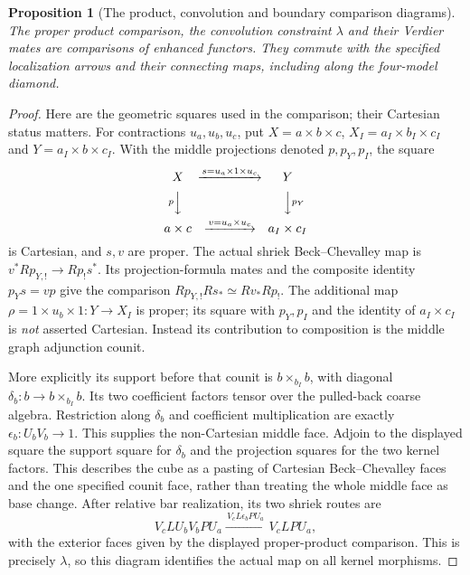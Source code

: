 \documentclass[11pt]{article}
\newtheorem{proposition}{Proposition}[section]
\theoremstyle{definition}
\theoremstyle{remark}
\begin{document}
\begin{proposition}[The product, convolution and boundary comparison diagrams]
\label{prop:mixed-comparison-diagrams}
The proper product comparison, the convolution constraint $\lambda$
and their Verdier mates are comparisons of enhanced functors.  They
commute with the specified localization arrows and their connecting
maps, including along the four-model diamond.
\end{proposition}
\begin{proof}
Here are the geometric squares used in the comparison; their
Cartesian status matters.  For contractions $u_a,u_b,u_c$, put
$X=a\times b\times c$, $X_I=a_I\times b_I\times c_I$ and
$Y=a_I\times b\times c_I$.  With the middle projections denoted
$p,p_Y,p_I$, the square
\[
\begin{CD}
 X @>{s=u_a\times1\times u_c}>> Y\\
 @V{p}VV @VV{p_Y}V\\
 a\times c @>{v=u_a\times u_c}>> a_I\times c_I
\end{CD}
\]
is Cartesian, and $s,v$ are proper.  The actual shriek
Beck--Chevalley map is $v^*Rp_{Y,!}\to Rp_!s^*$.
Its projection-formula mates and the composite identity
$p_Ys=vp$ give the comparison
$Rp_{Y,!}Rs_*\simeq Rv_*Rp_!$.
The additional map $\rho=1\times u_b\times1:Y\to X_I$ is
proper; its square with $p_Y,p_I$ and the identity of $a_I\times c_I$
is \emph{not} asserted Cartesian.  Instead its contribution to
composition is the middle graph adjunction counit.

More explicitly its support before that counit is
$b\times_{b_I}b$, with diagonal
$\delta_b:b\to b\times_{b_I}b$.  Its two coefficient factors tensor
over the pulled-back coarse algebra.  Restriction along $\delta_b$
and coefficient multiplication are exactly $\epsilon_b:U_bV_b\to1$.
This supplies the non-Cartesian middle face.  Adjoin to the displayed
square the support square for $\delta_b$ and the projection squares
for the two kernel factors.  This describes the cube as a pasting
of Cartesian Beck--Chevalley faces and the one specified counit
face, rather than treating the whole middle face as base change.
After relative bar realization, its two shriek routes are
\[
 V_c L U_b V_b P U_a\xrightarrow{\,V_cL\epsilon_b P U_a\,}
 V_c L P U_a,
\]
with the exterior faces given by the displayed proper-product
comparison.  This is precisely $\lambda$, so this diagram identifies
the actual map on all kernel morphisms.


\end{proof}
\end{document}
